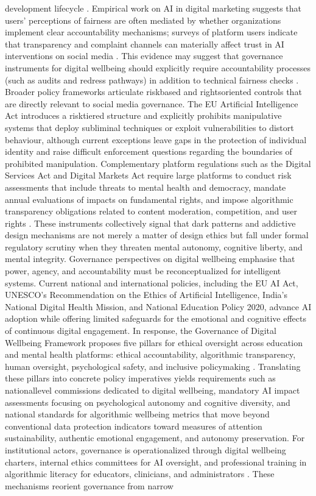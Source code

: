 \documentclass{article}
\begin{document}
development lifecycle \parencites[7]{9300898}[18]{8760542}. Empirical work on AI in digital marketing suggests that users' perceptions of fairness are often mediated by whether organizations implement clear accountability mechanisms; surveys of platform users indicate that transparency and complaint channels can materially affect trust in AI interventions on social media \parencites[2]{7161497}. This evidence may suggest that governance instruments for digital well\-being should explicitly require accountability processes (such as audits and redress pathways) in addition to technical fairness checks \parencites[2]{7161497}. Broader policy frameworks articulate risk\-based and rights\-oriented controls that are directly relevant to social media governance. The EU Artificial Intelligence Act introduces a risk\-tiered structure and explicitly prohibits manipulative systems that deploy subliminal techniques or exploit vulnerabilities to distort behaviour, although current exceptions leave gaps in the protection of individual identity and raise difficult enforcement questions regarding the boundaries of prohibited manipulation. Complementary platform regulations such as the Digital Services Act and Digital Markets Act require large platforms to conduct risk assessments that include threats to mental health and democracy, mandate annual evaluations of impacts on fundamental rights, and impose algorithmic transparency obligations related to content moderation, competition, and user rights \parencites[12]{4969503}. These instruments collectively signal that dark patterns and addictive design mechanisms are not merely a matter of design ethics but fall under formal regulatory scrutiny when they threaten mental autonomy, cognitive liberty, and mental integrity. Governance perspectives on digital well\-being emphasise that power, agency, and accountability must be re\-conceptualized for intelligent systems. Current national and international policies, including the EU AI Act, UNESCO's Recommendation on the Ethics of Artificial Intelligence, India's National Digital Health Mission, and National Education Policy 2020, advance AI adoption while offering limited safeguards for the emotional and cognitive effects of continuous digital engagement. In response, the Governance of Digital Well\-being Framework proposes five pillars for ethical oversight across education and mental health platforms: ethical accountability, algorithmic transparency, human oversight, psychological safety, and inclusive policymaking \parencites[2]{7808872}. Translating these pillars into concrete policy imperatives yields requirements such as national\-level commissions dedicated to digital well\-being, mandatory AI impact assessments focusing on psychological autonomy and cognitive diversity, and national standards for algorithmic well\-being metrics that move beyond conventional data protection indicators toward measures of attention sustainability, authentic emotional engagement, and autonomy preservation. For institutional actors, governance is operationalized through digital well\-being charters, internal ethics committees for AI oversight, and professional training in algorithmic literacy for educators, clinicians, and administrators \parencites[12]{7808872}. These mechanisms reorient governance from narrow 
\end{document}
